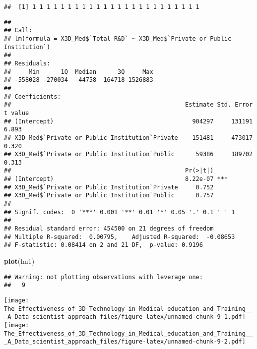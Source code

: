 \documentclass[]{article}
\newenvironment{Shaded}{\begin{snugshade}}{\end{snugshade}}
\newcommand{\CommentTok}[1]{\textcolor[rgb]{0.56,0.35,0.01}{\textit{#1}}}
\newcommand{\DataTypeTok}[1]{\textcolor[rgb]{0.13,0.29,0.53}{#1}}
\newcommand{\KeywordTok}[1]{\textcolor[rgb]{0.13,0.29,0.53}{\textbf{#1}}}
\newcommand{\NormalTok}[1]{#1}
\newcommand{\OperatorTok}[1]{\textcolor[rgb]{0.81,0.36,0.00}{\textbf{#1}}}
\newcommand{\StringTok}[1]{\textcolor[rgb]{0.31,0.60,0.02}{#1}}
\begin{document}
\begin{verbatim}
##  [1] 1 1 1 1 1 1 1 1 1 1 1 1 1 1 1 1 1 1 1 1 1 1 1 1
\end{verbatim}

\begin{Shaded}
\end{Shaded}

\begin{verbatim}
## 
## Call:
## lm(formula = X3D_Med$`Total R&D` ~ X3D_Med$`Private or Public Institution`)
## 
## Residuals:
##     Min      1Q  Median      3Q     Max 
## -558028 -270034  -44758  164718 1526883 
## 
## Coefficients:
##                                                 Estimate Std. Error t value
## (Intercept)                                       904297     131191   6.893
## X3D_Med$`Private or Public Institution`Private    151481     473017   0.320
## X3D_Med$`Private or Public Institution`Public      59386     189702   0.313
##                                                 Pr(>|t|)    
## (Intercept)                                     8.22e-07 ***
## X3D_Med$`Private or Public Institution`Private     0.752    
## X3D_Med$`Private or Public Institution`Public      0.757    
## ---
## Signif. codes:  0 '***' 0.001 '**' 0.01 '*' 0.05 '.' 0.1 ' ' 1
## 
## Residual standard error: 454500 on 21 degrees of freedom
## Multiple R-squared:  0.00795,    Adjusted R-squared:  -0.08653 
## F-statistic: 0.08414 on 2 and 21 DF,  p-value: 0.9196
\end{verbatim}

\begin{Shaded}
\begin{Highlighting}[]
\KeywordTok{plot}\NormalTok{(lm1)}
\end{Highlighting}
\end{Shaded}

\begin{verbatim}
## Warning: not plotting observations with leverage one:
##   9
\end{verbatim}

\texttt{[image: The\_Effectiveness\_of\_3D\_Technology\_in\_Medical\_education\_and\_Training\_\_\_A\_Data\_scientist\_approach\_files/figure-latex/unnamed-chunk-9-1.pdf]}
\texttt{[image: The\_Effectiveness\_of\_3D\_Technology\_in\_Medical\_education\_and\_Training\_\_\_A\_Data\_scientist\_approach\_files/figure-latex/unnamed-chunk-9-2.pdf]}
\end{document}
